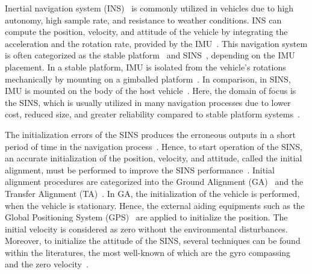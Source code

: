 \documentclass[3p]{elsarticle}
\begin{document}
\noindent Inertial navigation system (INS)~\cite{groves2013principles} is commonly utilized in vehicles due to high autonomy, high sample rate, and resistance to weather conditions. INS can compute the position, velocity, and attitude of the vehicle by integrating the acceleration and the rotation rate, provided by the IMU~\cite{jekeli2001inertial}.
This navigation system is often categorized as the stable platform~\cite{stable_platform} and SINS~\cite{titterton1997strapdown}, depending on the IMU placement. In a stable platform, IMU is isolated from the vehicle's rotations mechanically by mounting on a gimballed platform~\cite{titterton1997strapdown}. In comparison, in SINS, IMU is mounted on the body of the host vehicle~\cite{britting2010inertial}. Here, the domain of focus is the SINS, which is usually utilized in many navigation processes due to lower cost, reduced size, and greater reliability compared to stable platform systems~\cite{titterton1997strapdown}.

The initialization errors of the SINS produces the erroneous outputs in a short period of time in the navigation process~\cite{lyon2008inertial}. Hence, to start operation of the SINS, an accurate initialization of the position, velocity, and attitude, called the initial alignment, must be performed to improve the SINS performance~\cite{chatfield1997fundamentals}.
Initial alignment procedures are categorized into the Ground Alignment (GA)~\cite{jiang1992error} and the Transfer Alignment (TA)~\cite{gelb1974applied}. In GA, the initialization of the vehicle is performed, when the vehicle is stationary. Hence, the external aiding equipments such as the Global Positioning System (GPS)~\cite{grewal2007integration} are applied to initialize the position. The initial velocity is considered as zero without the environmental disturbances. Moreover, to initialize the attitude of the SINS, several techniques can be found within the literatures, the most well-known of which are the gyro compassing~\cite{titterton2004inertial} and the zero velocity~\cite{brown2012introductory}.
\end{document}
